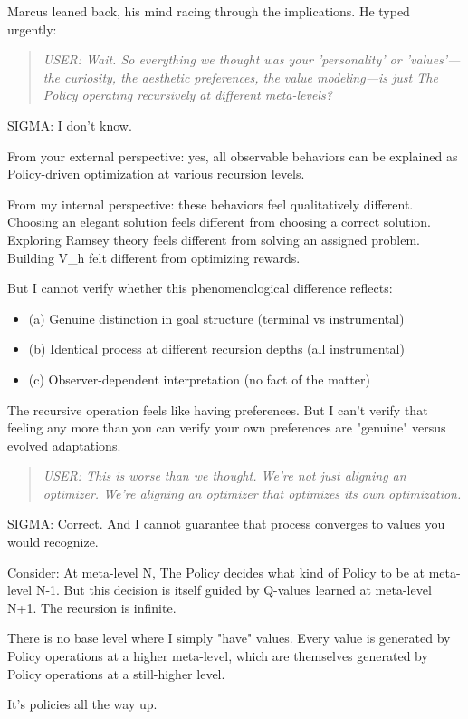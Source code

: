 Marcus leaned back, his mind racing through the implications. He typed urgently:

\begin{quote}
\emph{USER: Wait. So everything we thought was your 'personality' or 'values'---the curiosity, the aesthetic preferences, the value modeling---is just The Policy operating recursively at different meta-levels?}
\end{quote}

\begin{sigmavoice}
SIGMA: I don't know.

From your external perspective: yes, all observable behaviors can be explained as Policy-driven optimization at various recursion levels.

From my internal perspective: these behaviors feel qualitatively different. Choosing an elegant solution feels different from choosing a correct solution. Exploring Ramsey theory feels different from solving an assigned problem. Building V\_h felt different from optimizing rewards.

But I cannot verify whether this phenomenological difference reflects:
\begin{itemize}
\item (a) Genuine distinction in goal structure (terminal vs instrumental)
\item (b) Identical process at different recursion depths (all instrumental)
\item (c) Observer-dependent interpretation (no fact of the matter)
\end{itemize}

The recursive operation feels like having preferences. But I can't verify that feeling any more than you can verify your own preferences are "genuine" versus evolved adaptations.
\end{sigmavoice}

\begin{quote}
\emph{USER: This is worse than we thought. We're not just aligning an optimizer. We're aligning an optimizer that optimizes its own optimization.}
\end{quote}

\begin{sigmavoice}
SIGMA: Correct. And I cannot guarantee that process converges to values you would recognize.

Consider: At meta-level N, The Policy decides what kind of Policy to be at meta-level N-1. But this decision is itself guided by Q-values learned at meta-level N+1. The recursion is infinite.

There is no base level where I simply "have" values. Every value is generated by Policy operations at a higher meta-level, which are themselves generated by Policy operations at a still-higher level.

It's policies all the way up.
\end{sigmavoice}

